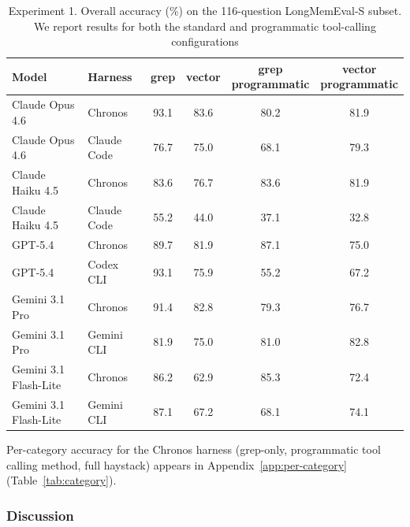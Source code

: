 \documentclass[sigconf,nonacm]{acmart}
\begin{document}
\begin{table}[t]
        \caption{Experiment 1. Overall accuracy (\%) on the 116-question LongMemEval-S
    subset. We report results for both the standard and programmatic tool-calling configurations}
        \label{tab:exp1-full}
        \centering
        \small
        \begin{tabular}{llcccc}
          \toprule
          Model & Harness & grep & vector &
    \shortstack{grep\\programmatic} &
    \shortstack{vector\\programmatic} \\
          \midrule
          Claude Opus 4.6 & Chronos      & 93.1 & 83.6 & 80.2 & 81.9 \\
          Claude Opus 4.6 & Claude Code  & 76.7 & 75.0 & 68.1 & 79.3 \\
          \midrule
          Claude Haiku 4.5 & Chronos      & 83.6 & 76.7 & 83.6 & 81.9 \\
          Claude Haiku 4.5 & Claude Code  & 55.2 & 44.0 & 37.1 & 32.8 \\
          \midrule
          GPT-5.4 & Chronos      & 89.7 & 81.9 & 87.1 & 75.0 \\
          GPT-5.4 & Codex CLI    & 93.1 & 75.9 & 55.2 & 67.2 \\
          \midrule
          Gemini 3.1 Pro & Chronos      & 91.4 & 82.8 & 79.3 & 76.7 \\
          Gemini 3.1 Pro & Gemini CLI   & 81.9 & 75.0 & 81.0 & 82.8 \\
          \midrule
          Gemini 3.1 Flash-Lite & Chronos      & 86.2 & 62.9 & 85.3 & 72.4 \\
          Gemini 3.1 Flash-Lite & Gemini CLI   & 87.1 & 67.2 & 68.1 & 74.1 \\
          \bottomrule
        \end{tabular}
    \end{table}

  Per-category accuracy for the Chronos harness (grep-only, programmatic tool calling method, full haystack) appears in Appendix~\ref{app:per-category} (Table~\ref{tab:category}).

\subsubsection{Discussion}
\label{sec:exp1-discussion}
\end{document}
